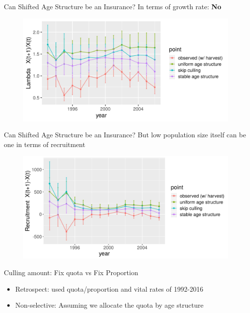 \documentclass{beamer}
\begin{document}
\begin{frame}{Can Shifted Age Structure be an Insurance?}
In terms of growth rate: \textbf{No}
	\begin{figure}[ht]
		\centering
		\includegraphics[width=\textwidth]{fig/Chicago_deer/Lambda.jpg}
		\label{lambda}
	\end{figure}
\end{frame}

\begin{frame}{Can Shifted Age Structure be an Insurance?}
But low population size itself can be one in terms of recruitment
\begin{figure}[ht]
	\centering
	\includegraphics[width=\textwidth]{fig/Chicago_deer/Recu.jpg}
	\label{recru}
\end{figure}
\end{frame}

\begin{frame}{Culling amount: Fix quota vs Fix Proportion}
\begin{itemize}
	\item Retrospect: used quota/proportion and vital rates of  1992-2016\\
	\item Non-selective: Assuming we allocate the quota by age structure 
\end{itemize}
\end{frame}
\end{document}
